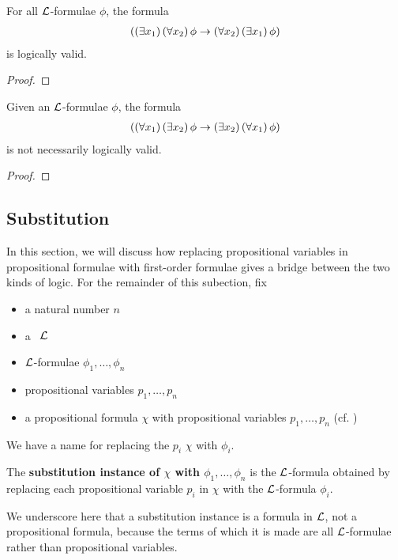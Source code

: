 \begin{boxexample}
    For all $\mathcal{L}$-formulae $\phi$, the formula
    \begin{align*}
        \left( \left( \exists x_1 \right)\left( \forall x_2 \right)\phi \to \left( \forall x_2 \right)\left( \exists x_1 \right)\phi \right)
    \end{align*}
    is logically valid.
    \begin{proof}
        \sorry
    \end{proof}
\end{boxexample}

\begin{boxnexample}
    Given an $\mathcal{L}$-formulae $\phi$, the formula
    \begin{align*}
        \left( \left( \forall x_1 \right)\left( \exists x_2 \right)\phi \to \left( \exists x_2 \right)\left( \forall x_1 \right)\phi \right)
    \end{align*}
    is not necessarily logically valid.
    \begin{proof}
        \sorry
    \end{proof}
\end{boxnexample}

\subsection{Substitution}

In this section, we will discuss how replacing propositional variables in propositional formulae with first-order formulae gives a bridge between the two kinds of logic. For the remainder of this subection, fix
\begin{itemize}
    \item a natural number $n$
    \item a \fola\ $\mathcal{L}$
    \item $\mathcal{L}$-formulae $\phi_1, \ldots, \phi_n$
    \item propositional variables $p_1, \ldots, p_n$
    \item a propositional formula $\chi$ with propositional variables $p_1, \ldots, p_n$ (cf. )
\end{itemize}

We have a name for replacing the $p_i$ $\chi$ with $\phi_i$.

\begin{boxdefinition}
    The \textbf{substitution instance of $\chi$ with $\phi_1, \ldots, \phi_n$} is the $\mathcal{L}$-formula obtained by replacing each propositional variable $p_i$ in $\chi$ with the $\mathcal{L}$-formula $\phi_i$.
\end{boxdefinition}
\begin{remark}
    We underscore here that a substitution instance is a formula in $\mathcal{L}$, not a propositional formula, because the terms of which it is made are all $\mathcal{L}$-formulae rather than propositional variables.
\end{remark}

